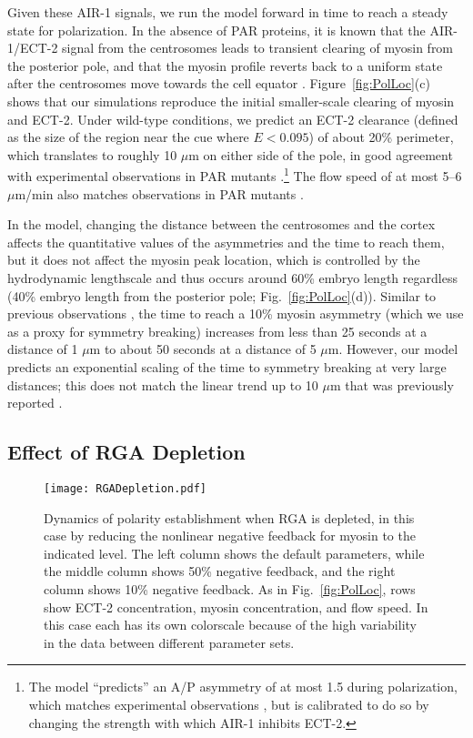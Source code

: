 \documentclass[11pt]{article}
\begin{document}
Given these AIR-1 signals, we run the model forward in time to reach a steady state for polarization. In the absence of PAR proteins, it is known that the AIR-1/ECT-2 signal from the centrosomes leads to transient clearing of myosin from the posterior pole, and that the myosin profile reverts back to a uniform state after the centrosomes move towards the cell equator \citep[Fig.~2E]{gross2019guiding}. Figure\ \ref{fig:PolLoc}(c) shows that our simulations reproduce the initial smaller-scale clearing of myosin and ECT-2. Under wild-type conditions, we predict an ECT-2 clearance (defined as the size of the region near the cue where $E < 0.095$) of about 20\% perimeter, which translates to roughly 10 $\mu$m on either side of the pole, in good agreement with experimental observations in PAR mutants \citep[Fig.~2E]{gross2019guiding}.\footnote{The model ``predicts'' an A/P asymmetry of at most 1.5 during polarization, which matches experimental observations \citep[Fig.~1]{longhini2022aurora}, but is calibrated to do so by changing the strength with which AIR-1 inhibits ECT-2.} The flow speed of at most 5--6 $\mu$m/min also matches observations in PAR mutants \citep[Fig.~2G]{gross2019guiding}. 

In the model, changing the distance between the centrosomes and the cortex affects the quantitative values of the asymmetries and the time to reach them, but it does not affect the myosin peak location, which is controlled by the hydrodynamic lengthscale and thus occurs around 60\% embryo length regardless (40\% embryo length from the posterior pole; Fig.\ \ref{fig:PolLoc}(d)). Similar to previous observations \citep[Fig.~3F]{bienkowska2012centrosomes}, the time to reach a 10\% myosin asymmetry (which we use as a proxy for symmetry breaking) increases from less than 25 seconds at a distance of 1 $\mu$m to about 50 seconds at a distance of 5 $\mu$m. However, our model predicts an exponential scaling of the time to symmetry breaking at very large distances; this does not match the linear trend up to 10 $\mu$m that was previously reported \citep[Fig.~3F]{bienkowska2012centrosomes}. 


\subsection{Effect of RGA Depletion}
\begin{figure}
\centering
\texttt{[image: RGADepletion.pdf]}
\caption{\label{fig:RGADepl}Dynamics of polarity establishment when RGA is depleted, in this case by reducing the nonlinear negative feedback for myosin to the indicated level. The left column shows the default parameters, while the middle column shows 50\% negative feedback, and the right column shows 10\% negative feedback. As in Fig.\ \ref{fig:PolLoc}, rows show ECT-2 concentration, myosin concentration, and flow speed. In this case each has its own colorscale because of the high variability in the data between different parameter sets. }
\end{figure}
\end{document}
